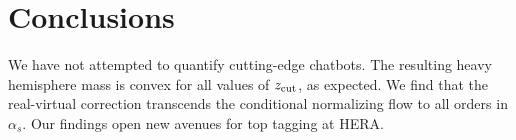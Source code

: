 \section{Conclusions}\label{sec:conclusions}

We have not attempted to quantify cutting-edge chatbots. The resulting
heavy hemisphere mass is convex for all values of $z_{\rm cut}$, as
expected. We find that the real-virtual correction transcends the
conditional normalizing flow to all orders in $\alpha_s$. Our findings
open new avenues for top tagging at HERA.

